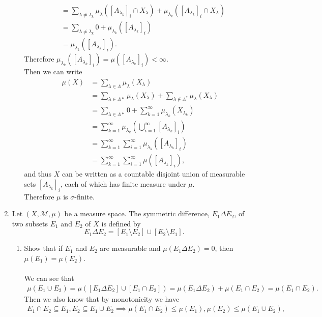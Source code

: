 \begin{enumerate}
\begin{enumerate}[label=(\roman*),align=left]
\begin{align*}
			&=\sum_{\lambda\neq\lambda_k} \mu_\lambda([A_{\lambda_k}]_i\cap X_\lambda)+\mu_{\lambda_k}([A_{\lambda_k}]_i\cap X_\lambda)\\
			&=\sum_{\lambda\neq\lambda_k} 0+\mu_{\lambda_k}([A_{\lambda_k}]_i)\\
			&=\mu_{\lambda_k}([A_{\lambda_k}]_i).
		\end{align*}
		Therefore $\mu_{\lambda_k}([A_{\lambda_k}]_i)=\mu([A_{\lambda_k}]_i)<\infty$.
		\\Then we can write
		\begin{align*}
			\mu(X)&=\sum_{\lambda\in\Lambda} \mu_\lambda(X_\lambda)\\		
			&=\sum_{\lambda\in\Lambda*} \mu_\lambda(X_\lambda)+\sum_{\lambda\notin\Lambda^*} \mu_\lambda(X_\lambda)\\	
			&=\sum_{\lambda\in\Lambda*} 0+\sum_{k=1}^\infty \mu_{\lambda_{k}}(X_{\lambda_{k}})\\
			&=\sum_{k=1}^\infty \mu_{\lambda_{k}}(\bigcup_{i=1}^\infty [A_{\lambda_k}]_i)\\
			&=\sum_{k=1}^\infty \sum_{i=1}^\infty \mu_{\lambda_{k}}( [A_{\lambda_k}]_i)\\
			&=\sum_{k=1}^\infty\sum_{i=1}^\infty \mu([A_{\lambda_k}]_i),
		\end{align*}
		and thus $X$ can be written as a countable disjoint union of measurable sets $[A_{\lambda_k}]_i$, each of which has finite measure under $\mu$.
		\\Therefore $\mu$ is $\sigma$-finite.
	\end{enumerate}
	\item Let $(X,\mathcal{M},\mu)$ be a measure space. The symmetric difference, $E_1\Delta E_2$, of two subsets $E_1$ and $E_2$ of $X$ is defined by
	\[
		E_1\Delta E_2=[E_1\setminus E_2]\cup[E_2\setminus E_1].
	\]
	\begin{enumerate}[label=(\roman*),align=left]   
		\item Show that if $E_1$ and $E_2$ are measurable and $\mu(E_1\Delta E_2)=0$, then $\mu(E_1)=\mu(E_2)$.\\
		\\We can see that
		\begin{align*}
			\mu(E_1\cup E_2)=\mu([E_1\Delta E_2]\cup[E_1\cap E_2])=\mu(E_1\Delta E_2)+\mu(E_1\cap E_2)=\mu(E_1\cap E_2).
		\end{align*}
		Then we also know that by monotonicity we have
		\begin{align*}
			E_1\cap E_2\subseteq E_1,E_2\subseteq E_1\cup E_2\implies\mu(E_1\cap E_2)\le\mu(E_1),\mu(E_2)\le\mu(E_1\cup E_2),

\end{align*}
\end{enumerate}
\end{enumerate}
